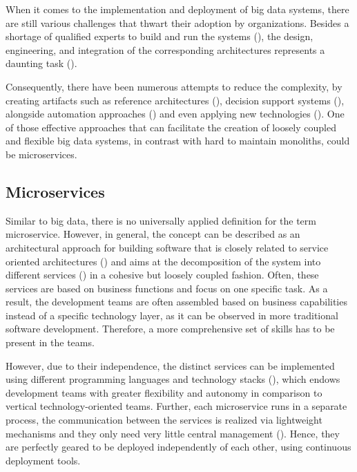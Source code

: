 \documentclass[conference]{IEEEtran}
\begin{document}
When it comes to the implementation and deployment of big data systems, there are still various challenges that thwart their adoption by organizations. Besides a shortage of qualified experts to build and run the systems (\cite{Gardiner.2018}), the design, engineering, and integration of the corresponding architectures represents a daunting task (\cite{Volk.2019}).

Consequently, there have been numerous attempts to reduce the complexity, by creating artifacts such as reference architectures (\cite{ataei2021neomycelia}), decision support systems (\cite{Volk.2020}), alongside automation approaches (\cite{Fernandez.2020}) and even applying new technologies (\cite{Freymann.2020}). One of those effective approaches that can facilitate the creation of loosely coupled and flexible big data systems, in contrast with hard to maintain monoliths, could be microservices. 

\subsection{Microservices}

Similar to big data, there is no universally applied definition for the term microservice. However, in general, the concept can be described as an architectural approach for building software that is closely related to service oriented architectures (\cite{Jamshidi.2018}) and aims at the decomposition of the system into different services (\cite{Nadareishvili.2016}) in a cohesive but loosely coupled fashion. Often, these services are based on business functions and focus on one specific task. As a result, the development teams are often assembled based on business capabilities instead of a specific technology layer, as it can be observed in more traditional software development. Therefore, a more comprehensive set of skills has to be present in the teams.

However, due to their independence, the distinct services can be implemented using different programming languages and technology stacks (\cite{Freymann.2020}), which endows development teams with greater flexibility and autonomy in comparison to vertical technology-oriented teams. Further, each microservice runs in a separate process, the communication between the services is realized via lightweight mechanisms and they only need very little central management (\cite{Drews.2017}). Hence, they are perfectly geared to be deployed independently of each other, using continuous deployment tools.
\end{document}
